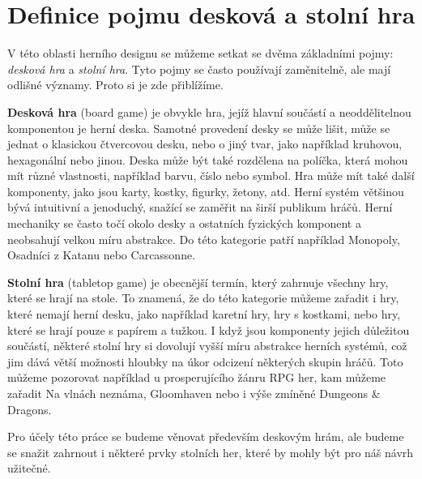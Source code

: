 \section{Definice pojmu desková a stolní hra}
\label{subsec:boardgame_definition}

V této oblasti herního designu se můžeme setkat se dvěma základními pojmy: \textit{desková hra} a \textit{stolní hra}. Tyto pojmy se často používají zaměnitelně, ale mají odlišné významy. Proto si je zde přiblížíme.

\textbf{Desková hra} (board game) je obvykle hra, jejíž hlavní součástí a neoddělitelnou komponentou je herní deska. Samotné provedení desky se může lišit, může se jednat o klasickou čtvercovou desku, nebo o jiný tvar, jako například kruhovou, hexagonální nebo jinou. Deska může být také rozdělena na políčka, která mohou mít různé vlastnosti, například barvu, číslo nebo symbol. Hra může mít také další komponenty, jako jsou karty, kostky, figurky, žetony, atd. Herní systém většinou bývá intuitivní a jenoduchý, snažící se zaměřit na širší publikum hráčů. Herní mechaniky se často točí okolo desky a ostatních fyzických komponent a neobsahují velkou míru abstrakce. Do této kategorie patří například Monopoly, Osadníci z Katanu nebo Carcassonne. \cite{board_game_supply_2023}

\textbf{Stolní hra} (tabletop game) je obecnější termín, který zahrnuje všechny hry, které se hrají na stole. To znamená, že do této kategorie můžeme zařadit i hry, které nemají herní desku, jako například karetní hry, hry s kostkami, nebo hry, které se hrají pouze s papírem a tužkou. I když jsou komponenty jejich důležitou součástí, některé stolní hry si dovolují vyšší míru abstrakce herních systémů, což jim dává větší možnosti hloubky na úkor odcizení některých skupin hráčů. Toto můžeme pozorovat například u prosperujícího žánru RPG her, kam můžeme zařadit Na vlnách neznáma, Gloomhaven nebo i výše zmíněné Dungeons \& Dragons. \cite{board_game_supply_2023}

Pro účely této práce se budeme věnovat především deskovým hrám, ale budeme se snažit zahrnout i některé prvky stolních her, které by mohly být pro náš návrh užitečné.